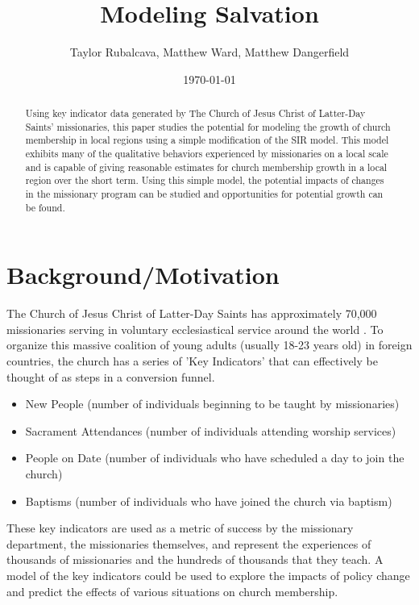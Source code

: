 \documentclass[11pt]{amsart}
\begin{document}
\title{Modeling Salvation}
\author{Taylor Rubalcava, Matthew Ward, Matthew  Dangerfield}

\date{\today} %

\begin{abstract}
Using key indicator data generated by The Church of Jesus Christ of Latter-Day Saints' missionaries, this paper studies the potential for modeling the growth of church membership in local regions using a simple modification of the SIR model. This model exhibits many of the qualitative behaviors experienced by missionaries on a local scale and is capable of giving reasonable estimates for church membership growth in a local region over the short term. Using this simple model, the potential impacts of changes in the missionary program can be studied and opportunities for potential growth can be found.
\end{abstract}

\maketitle %

\section{Background/Motivation}

The Church of Jesus Christ of Latter-Day Saints has approximately 70,000 missionaries serving in voluntary ecclesiastical service around the world \cite{Church1}. To organize this massive coalition of young adults (usually 18-23 years old) in foreign countries, the church has a series of 'Key Indicators' that can effectively be thought of as steps in a conversion funnel.

\begin{itemize}
  \item New People (number of individuals beginning to be taught by missionaries)
  \item Sacrament Attendances (number of individuals attending worship services)
  \item People on Date (number of individuals who have scheduled a day to join the church)
  \item Baptisms (number of individuals who have joined the church via baptism)
\end{itemize} \cite{Church2}

These key indicators are used as a metric of success by the missionary department, the missionaries themselves, and represent the experiences of thousands of missionaries and the hundreds of thousands that they teach. A model of the key indicators could be used to explore the impacts of policy change and predict the effects of various situations on church membership. 
\end{document}
